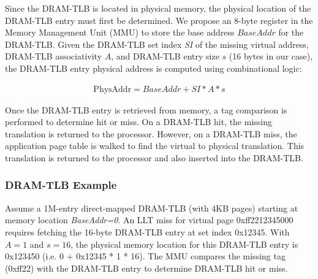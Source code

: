 

\noindent Since the DRAM-TLB is located in physical memory, the
physical location of the DRAM-TLB entry must first be determined. We
propose an 8-byte register in the Memory Management Unit (MMU) to
store the base address $BaseAddr$ for the DRAM-TLB. Given the DRAM-TLB
set index {\em SI} of the missing virtual address, DRAM-TLB
associativity $A$, and DRAM-TLB entry size $s$ (16 bytes in our case),
the DRAM-TLB entry physical address is computed using combinational
logic: 

\begin{equation}
  \begin{array}{rl}
    \text{PhysAddr} = BaseAddr + SI * A * s
  \end{array}
\end{equation}

\noindent Once the DRAM-TLB entry is retrieved from memory, a tag
comparison is performed to determine hit or miss. On a DRAM-TLB hit,
the missing translation is returned to the processor. However, on a
DRAM-TLB miss, the application page table is walked to find the
virtual to physical translation. This translation is returned to the
processor and also inserted into the DRAM-TLB. 

\subsubsection{DRAM-TLB Example}

\noindent Assume a 1M-entry direct-mapped DRAM-TLB (with 4KB pages)
starting at memory location {\em BaseAddr=0}. An LLT miss for virtual
page 0xff2212345000 requires fetching the 16-byte DRAM-TLB entry at
set index 0x12345. With $A=1$ and $s=16$, the physical memory location
for this DRAM-TLB entry is 0x123450 (i.e. 0 + 0x12345 * 1 * 16). The
MMU compares the missing tag (0xff22) with the DRAM-TLB entry to
determine DRAM-TLB hit or miss.


